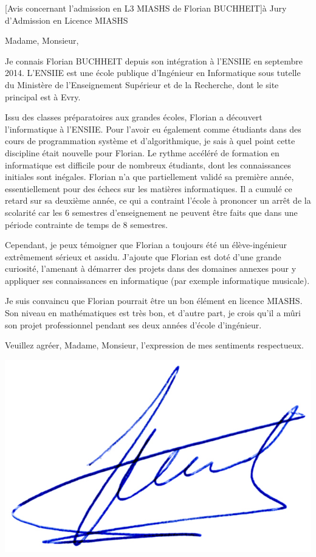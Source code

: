 \documentclass[a4paper,10pt]{article}
\begin{document}

\begin{letter}[Avis concernant l'admission en L3 MIASHS de Florian BUCHHEIT]{à}%
{Jury d'Admission en Licence MIASHS}


Madame, Monsieur,

Je  connais Florian  BUCHHEIT depuis  son  intégration à  l'ENSIIE en  septembre
2014. L'ENSIIE est  une école publique d'Ingénieur en  Informatique sous tutelle
du  Ministère de  l'Enseignement  Supérieur et  de la  Recherche,  dont le  site
principal est à Evry.

Issu  des  classes  préparatoires  aux   grandes  écoles,  Florian  a  découvert
l'informatique à  l'ENSIIE. Pour l'avoir  eu également comme étudiants  dans des
cours de  programmation système et d'algorithmique,  je sais à quel  point cette
discipline  était nouvelle  pour Florian.   Le rythme  accéléré de  formation en
informatique est  difficile pour de  nombreux étudiants, dont  les connaissances
initiales sont inégales. Florian n'a que partiellement validé sa première année,
essentiellement pour des échecs sur les matières informatiques. Il a cumulé ce
retard sur sa deuxième année, ce qui a contraint l'école à prononcer un arrêt de
la scolarité car les 6 semestres d'enseignement ne peuvent être faits que dans
une période contrainte de temps de 8 semestres.

Cependant, je peux témoigner que Florian a toujours été un élève-ingénieur
extrêmement sérieux et assidu. J'ajoute que Florian est doté d'une grande
curiosité, l'amenant à démarrer des projets dans des domaines annexes pour y
appliquer ses connaissances en informatique (par exemple informatique musicale).

Je suis convaincu que Florian pourrait être un bon élément en licence MIASHS.
Son niveau en mathématiques est très bon, et d'autre part, je crois qu'il a mûri
son projet professionnel pendant ses deux années d'école d'ingénieur.

Veuillez agréer, Madame, Monsieur, l'expression de mes sentiments respectueux.
\end{letter}
\begin{flushright}
\includegraphics[width=.2\textwidth]{signgenaud.jpg}
\end{flushright}
\end{document}
